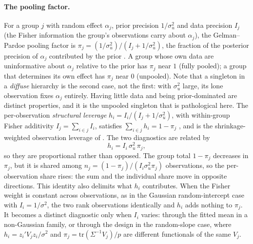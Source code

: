 \documentclass[11pt]{article}
\begin{document}
\paragraph{The pooling factor.}
For a group $j$ with random effect $\alpha_j$, prior precision $1/\sigma_u^2$ and
data precision $I_j$ (the Fisher information the group's observations carry about
$\alpha_j$), the Gelman--Pardoe pooling factor is
$\pi_j = (1/\sigma_u^2)/(I_j + 1/\sigma_u^2)$, the fraction of the posterior
precision of $\alpha_j$ contributed by the prior \citep{gelman2006weakly}. A
group whose own data are uninformative about $\alpha_j$ relative to the prior has
$\pi_j$ near $1$ (fully pooled); a group that determines its own effect has
$\pi_j$ near $0$ (unpooled). Note that a singleton in a \emph{diffuse} hierarchy
is the second case, not the first: with $\sigma_u^2$ large, its lone observation
fixes $\alpha_j$ entirely. Having little data and being prior-dominated are
distinct properties, and it is the unpooled singleton that is pathological here.
The per-observation
\emph{structural leverage} $h_i = I_i/(I_j + 1/\sigma_u^2)$, with within-group
Fisher additivity $I_j=\sum_{i\in j}I_i$, satisfies $\sum_{i \in j} h_i = 1 - \pi_j$
\citep{bindoff2026fibr}, and is the shrinkage-weighted observation leverage of
\citet{lovison2026augmented}. The two diagnostics are related by
\[
h_i = I_i\,\sigma_u^2\,\pi_j ,
\]
so they are proportional rather than opposed. The group total $1-\pi_j$ decreases
in $\pi_j$, but it is shared among $n_j = (1-\pi_j)/(I_i\sigma_u^2\pi_j)$
observations, so the per-observation share rises: the sum and the individual share
move in opposite directions. This identity also delimits what $h_i$ contributes.
When the Fisher weight is constant across observations, as in the Gaussian
random-intercept case with $I_i = 1/\sigma^2$, the two rank observations
identically and $h_i$ adds nothing to $\pi_j$. It becomes a distinct diagnostic
only when $I_i$ varies: through the fitted mean in a non-Gaussian family, or
through the design in the random-slope case, where $h_i = z_i'V_jz_i/\sigma^2$ and
$\pi_j = \mathrm{tr}(\Sigma^{-1}V_j)/p$ are different functionals of the same $V_j$.
\end{document}
